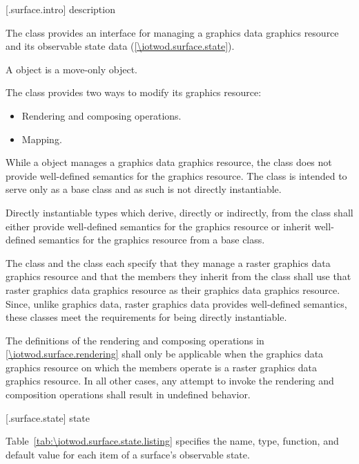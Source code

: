  [\iotwod.surface.intro] { description}

\pnum
{}
The  class provides an interface for managing a graphics
data graphics resource and its observable state data
(\ref{\iotwod.surface.state}).

\pnum
A  object is a move-only object.

\pnum
The  class provides two ways to modify its graphics resource:
\begin{itemize}
\item Rendering and composing operations.
\item Mapping.
\end{itemize}

\pnum
\enternote
While a  object manages a graphics data graphics resource, the  class does not provide well-defined semantics for the graphics resource. The  class is intended to serve only as a base class and as such is not directly instantiable.
\exitnote

\pnum
Directly instantiable types which derive, directly or indirectly, from the  class shall either provide well-defined semantics for the graphics resource or inherit well-defined semantics for the graphics resource from a base class.

\pnum
\enterexample
The  class and the  class each specify that they manage a raster graphics data graphics resource and that the members they inherit from the  class shall use that raster graphics data graphics resource as their graphics data graphics resource. Since, unlike graphics data, raster graphics data provides well-defined semantics, these classes meet the requirements for being directly instantiable.
\exitexample

\pnum
The definitions of the rendering and composing operations in \ref{\iotwod.surface.rendering} shall only be applicable when the graphics data graphics resource on which the  members operate is a raster graphics data graphics resource. In all other cases, any attempt to invoke the rendering and composition operations shall result in undefined behavior.

 [\iotwod.surface.state] { state}

\pnum
Table~\ref{tab:\iotwod.surface.state.listing} specifies the name, type, function, and default value for each item of a surface's observable state.

